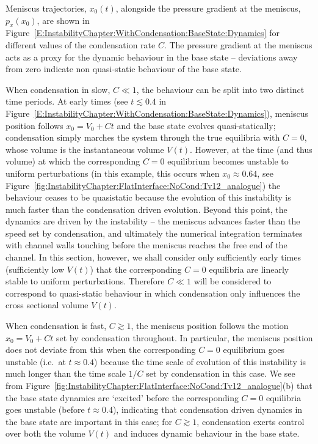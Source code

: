 Meniscus trajectories, $x_0(t)$, alongside the pressure gradient at the meniscus, $p_x(x_0)$, are shown in Figure~\ref{E:InstabilityChapter:WithCondensation:BaseState:Dynamics} for different values of the condensation rate $C$. The pressure gradient at the meniscus acts as a proxy for the dynamic behaviour in the base state -- deviations away from zero indicate non quasi-static behaviour of the base state.


When condensation in slow, $C \ll 1$, the behaviour can be  split into two distinct time periods. At early times  (see $t \lesssim 0.4$ in Figure~\ref{E:InstabilityChapter:WithCondensation:BaseState:Dynamics}), meniscus position follows $x_0 = V_0 + Ct$ and the base state evolves quasi-statically; condensation simply marches the system through the true equilibria with $C = 0$, whose volume is the instantaneous volume $V(t)$. However, at the  time (and thus volume) at which the corresponding $C =0$ equilibrium becomes unstable to uniform perturbations (in this example, this occurs when $x_0 \approx 0.64$, see Figure~\ref{fig:InstabilityChapter:FlatInterface:NoCond:Tv12_analogue}) the behaviour ceases to be quasistatic because the evolution of this instability is much faster than the condensation driven evolution. Beyond this point, the dynamics are driven by the instability -- the meniscus advances faster than the speed set by condensation, and ultimately the numerical integration terminates with channel walls touching before the meniscus reaches the free end of the channel. In this section, however, we shall consider only sufficiently early times (sufficiently low $V(t)$) that the corresponding $C =0$ equilibria are linearly stable to uniform perturbations. Therefore $C\ll 1$ will be considered to correspond to quasi-static behaviour in which condensation only influences the cross sectional volume $V(t)$.

When condensation is fast, $C \gtrsim 1$, the meniscus position follows the motion $x_0 = V_0 + Ct$ set by condensation throughout. In particular, the meniscus position does not deviate from this when the corresponding $C = 0$ equilibrium goes unstable (i.e.~at $t \approx 0.4$) because the time scale of evolution of this instability is much longer than the time scale $1/C$ set by condensation in this case. We see from Figure~\ref{fig:InstabilityChapter:FlatInterface:NoCond:Tv12_analogue}(b) that the base state dynamics are `excited' before the corresponding $C = 0$ equilibria goes unstable (before  $t \approx 0.4$), indicating that condensation driven dynamics in the base state are important in this case; for $C \gtrsim 1$, condensation exerts control over both the volume $V(t)$ and induces dynamic behaviour in the base state.

